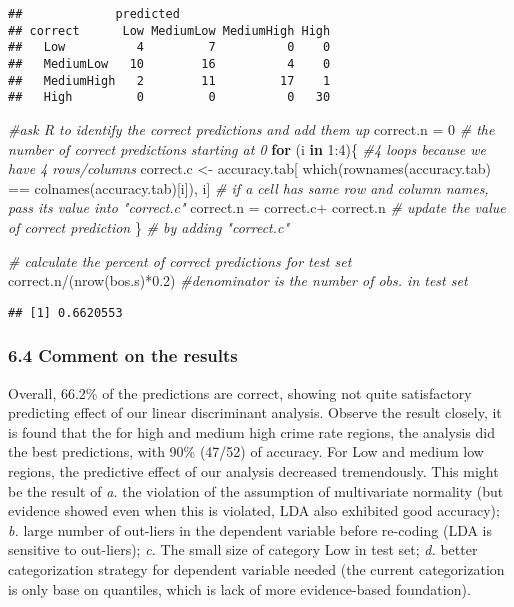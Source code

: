 \documentclass[
]{article}
\newenvironment{Shaded}{\begin{snugshade}}{\end{snugshade}}
\newcommand{\CommentTok}[1]{\textcolor[rgb]{0.56,0.35,0.01}{\textit{#1}}}
\newcommand{\ControlFlowTok}[1]{\textcolor[rgb]{0.13,0.29,0.53}{\textbf{#1}}}
\newcommand{\DecValTok}[1]{\textcolor[rgb]{0.00,0.00,0.81}{#1}}
\newcommand{\FloatTok}[1]{\textcolor[rgb]{0.00,0.00,0.81}{#1}}
\newcommand{\FunctionTok}[1]{\textcolor[rgb]{0.00,0.00,0.00}{#1}}
\newcommand{\NormalTok}[1]{#1}
\newcommand{\OtherTok}[1]{\textcolor[rgb]{0.56,0.35,0.01}{#1}}
\newcommand{\SpecialCharTok}[1]{\textcolor[rgb]{0.00,0.00,0.00}{#1}}
\begin{document}
\begin{verbatim}
##             predicted
## correct      Low MediumLow MediumHigh High
##   Low          4         7          0    0
##   MediumLow   10        16          4    0
##   MediumHigh   2        11         17    1
##   High         0         0          0   30
\end{verbatim}

\begin{Shaded}
\begin{Highlighting}[]
\CommentTok{\#ask R to identify the correct predictions and add them up}
\NormalTok{correct.n }\OtherTok{=} \DecValTok{0} \CommentTok{\# the number of correct predictions starting at 0}
\ControlFlowTok{for}\NormalTok{ (i }\ControlFlowTok{in} \DecValTok{1}\SpecialCharTok{:}\DecValTok{4}\NormalTok{)\{ }\CommentTok{\#4 loops because we have 4 rows/columns}
\NormalTok{  correct.c }\OtherTok{\textless{}{-}}\NormalTok{ accuracy.tab[}
    \FunctionTok{which}\NormalTok{(}\FunctionTok{rownames}\NormalTok{(accuracy.tab) }\SpecialCharTok{==} \FunctionTok{colnames}\NormalTok{(accuracy.tab)[i]), }
\NormalTok{    i] }\CommentTok{\# if a cell has same row and column names, pass its value into "correct.c"}
\NormalTok{  correct.n }\OtherTok{=}\NormalTok{ correct.c}\SpecialCharTok{+}\NormalTok{ correct.n }\CommentTok{\# update the value of correct prediction}
\NormalTok{\}                                  }\CommentTok{\# by adding "correct.c"}

\CommentTok{\# calculate the percent of correct predictions for test set}
\NormalTok{correct.n}\SpecialCharTok{/}\NormalTok{(}\FunctionTok{nrow}\NormalTok{(bos.s)}\SpecialCharTok{*}\FloatTok{0.2}\NormalTok{) }\CommentTok{\#denominator is the number of obs. in test set}
\end{Highlighting}
\end{Shaded}

\begin{verbatim}
## [1] 0.6620553
\end{verbatim}

\hypertarget{comment-on-the-results}{%
\subsubsection{6.4 Comment on the
results}\label{comment-on-the-results}}

Overall, 66.2\% of the predictions are correct, showing not quite
satisfactory predicting effect of our linear discriminant analysis.
Observe the result closely, it is found that the for high and medium
high crime rate regions, the analysis did the best predictions, with
90\% (47/52) of accuracy. For Low and medium low regions, the predictive
effect of our analysis decreased tremendously. This might be the result
of \emph{a.} the violation of the assumption of multivariate normality
(but evidence showed even when this is violated, LDA also exhibited good
accuracy); \emph{b.} large number of out-liers in the dependent variable
before re-coding (LDA is sensitive to out-liers); \emph{c.} The small
size of category Low in test set; \emph{d.} better categorization
strategy for dependent variable needed (the current categorization is
only base on quantiles, which is lack of more evidence-based
foundation).
\end{document}
